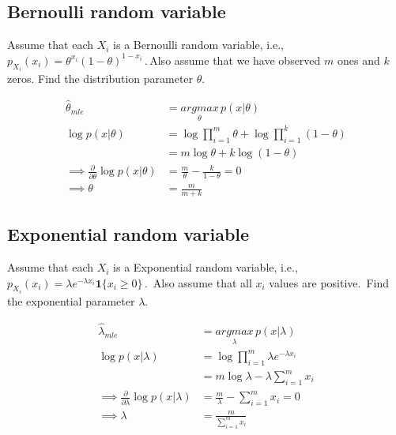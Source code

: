 \documentclass[12pt]{article}
\begin{document}
\subsection{Bernoulli random variable}
Assume that each $X_i$ is a Bernoulli random variable, i.e.,\; $p_{X_i}(x_i) = \theta^{x_i}(1-\theta)^{1-x_i}$\,.\,Also assume that we have observed $m$ ones and $k$ zeros. Find the distribution parameter $\theta$.
\begin{qsolve}
    \begin{align*}
        \hat{\theta}_{mle}                                         & = \underset{\theta}{argmax} \, p(x|\theta)                  \\
        \log p(x|\theta)                                           & = \log \prod_{i=1}^m \theta + \log \prod_{i=1}^k (1-\theta) \\
                                                                   & = m \log \theta + k \log (1-\theta)                         \\
        \implies \frac{\partial}{\partial \theta} \log p(x|\theta) & = \frac{m}{\theta} - \frac{k}{1-\theta} = 0                 \\
        \implies \theta                                            & = \frac{m}{m+k}
    \end{align*}
\end{qsolve}
\subsection{Exponential random variable}
Assume that each $X_i$ is a Exponential random variable, i.e.,\, $p_{X_i}(x_i)=\lambda e^{-\lambda x_i} \textbf{1} \{ x_i \geq 0 \} $\,.\, Also assume that all $x_i$ values are positive.\, Find the exponential parameter $\lambda$.
\begin{qsolve}
    \begin{align*}
        \hat{\lambda}_{mle}                                          & = \underset{\lambda}{argmax} \, p(x|\lambda)  \\
        \log p(x|\lambda)                                            & = \log \prod_{i=1}^m \lambda e^{-\lambda x_i} \\
                                                                     & = m \log \lambda - \lambda \sum_{i=1}^m x_i   \\
        \implies \frac{\partial}{\partial \lambda} \log p(x|\lambda) & = \frac{m}{\lambda} - \sum_{i=1}^m x_i = 0    \\
        \implies \lambda                                             & = \frac{m}{\sum_{i=1}^m x_i}
    \end{align*}
\end{qsolve}
\end{document}

